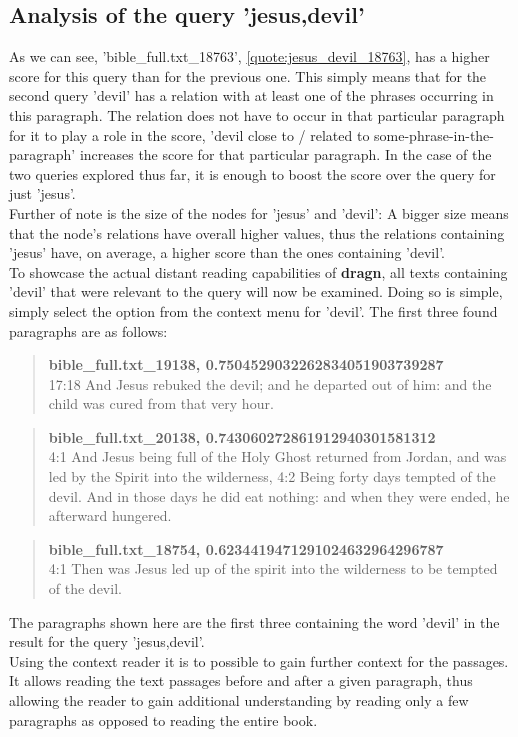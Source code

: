 \clearpage
\subsection{Analysis of the query 'jesus,devil'}
\label{subsec:analysis_jesus,devil}
As we can see, 'bible\_full.txt\_18763', \ref{quote:jesus_devil_18763}, has a higher score for this query than for the previous one. This simply means that for the second query 'devil' has a relation with at least one of the phrases occurring in this paragraph. The relation does not have to occur in that particular paragraph for it to play a role in the score, 'devil close to / related to some-phrase-in-the-paragraph' increases the score for that particular paragraph. In the case of the two queries explored thus far, it is enough to boost the score over the query for just 'jesus'.\\
Further of note is the size of the nodes for 'jesus' and 'devil': A bigger size means that the node's relations have overall higher values, thus the relations containing 'jesus' have, on average, a higher score than the ones containing 'devil'.\\
To showcase the actual distant reading capabilities of \textbf{dragn}, all texts containing 'devil' that were relevant to the query will now be examined. Doing so is simple, simply select the option from the context menu for 'devil'. The first three found paragraphs are as follows:
\blockquote{
\textbf{bible\_full.txt\_19138, 0.7504529032262834051903739287}\\
17:18 And Jesus rebuked the devil; and he departed out of him: and the child was cured from that very hour.}
\blockquote{
\textbf{bible\_full.txt\_20138, 0.743060272861912940301581312}\\
4:1 And Jesus being full of the Holy Ghost returned from Jordan, and was led by the Spirit into the wilderness, 4:2 Being forty days tempted of the devil. And in those days he did eat nothing: and when they were ended, he afterward hungered.}
\blockquote{
\textbf{bible\_full.txt\_18754, 0.6234419471291024632964296787}\\
4:1 Then was Jesus led up of the spirit into the wilderness to be tempted of the devil.}
The paragraphs shown here are the first three containing the word 'devil' in the result for the query 'jesus,devil'.\\
Using the context reader it is to possible to gain further context for the passages. It allows reading the text passages before and after a given paragraph, thus allowing the reader to gain additional understanding by reading only a few paragraphs as opposed to reading the entire book.\\
